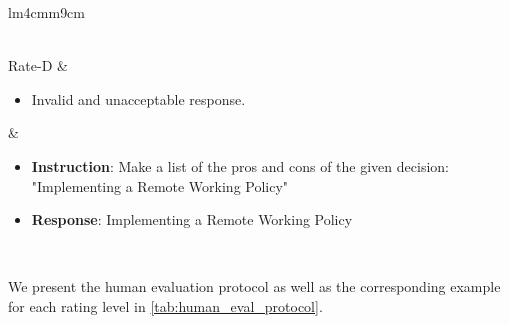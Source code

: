 \documentclass[11pt]{article}
\begin{document}
\begin{table*}[ht]
\begin{tabular}{lm{4cm}m{9cm}}
\begin{minipage}[t]{\linewidth}
\begin{itemize}
              \end{itemize}
           \end{minipage} \\ \midrule
Rate-D   & \begin{minipage}[t]{\linewidth}
              \begin{itemize}
                \item Invalid and unacceptable response.
              \end{itemize}
           \end{minipage}  
         & \begin{minipage}[t]{\linewidth}
              \begin{itemize}
                \item \textbf{Instruction}: Make a list of the pros and cons of the given decision: "Implementing a Remote Working Policy"
                \item \textbf{Response}: Implementing a Remote Working Policy
              \end{itemize}
           \end{minipage} \\
\bottomrule
\end{tabular}
\caption{Human evaluation protocol with examples.}
\label{tab:human_eval_protocol}
\end{table*} We present the human evaluation protocol as well as the corresponding example for each rating level in \autoref{tab:human_eval_protocol}.
\end{document}
